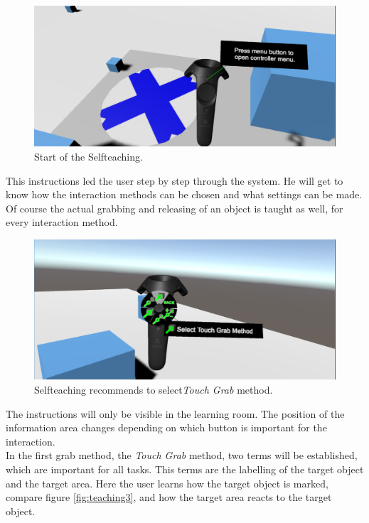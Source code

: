 \begin{figure}[H] 
	\center 
	\includegraphics[width=12cm]{Images/teaching.PNG}
	\caption[Start of the Selfteaching.]{Start of the Selfteaching.}
	\label{fig:teaching1}
\end{figure}

This instructions led the user step by step through the system. He will get to know how the interaction methods can be chosen and what settings can be made. Of course the actual grabbing and releasing of an object is taught as well, for every interaction method. 

\begin{figure}[H] 
	\center 
	\includegraphics[width=12cm]{Images/teaching2.PNG}
	\caption[Selfteaching recommends to select \textit{Touch Grab} method.]{Selfteaching recommends to select\textit{Touch Grab} method.}
	\label{fig:teaching2}
\end{figure}

The instructions will only be visible in the learning room. The position of the information area changes depending on which button is important for the interaction. \\
In the first grab method, the \textit{Touch Grab} method, two terms will be established, which are important for all tasks. This terms are the labelling of the target object and the target area. Here the user learns how the target object is marked, compare figure \ref{fig:teaching3}, and how the target area reacts to the target object.

